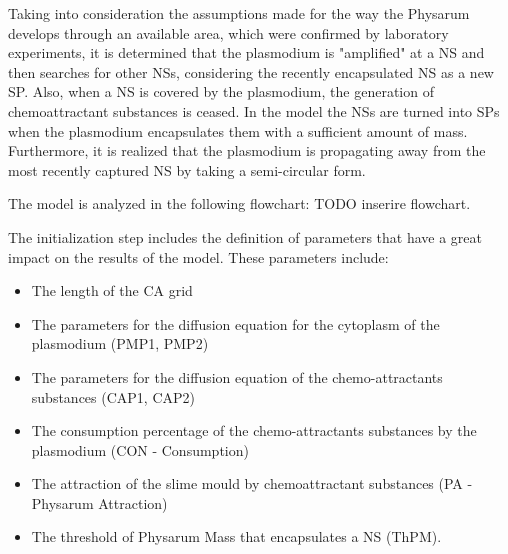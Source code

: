 Taking into consideration the assumptions made for the way the Physarum develops through an available area, which were confirmed by laboratory experiments, it is determined that the plasmodium is "amplified" at a NS and then searches for other NSs, considering the recently encapsulated NS as a new SP. Also, when a NS is covered by the plasmodium, the generation of chemoattractant substances is ceased.
In the model the NSs are turned into SPs when the plasmodium encapsulates them with a sufficient amount of mass. Furthermore, it is realized that the plasmodium is propagating away from the most recently captured NS by taking a semi-circular form. 
\par
The model is analyzed in the following flowchart: TODO inserire flowchart.
\par
The initialization step includes the definition of parameters that have a great impact on the results of the model. These parameters include:
\begin{itemize}
	\item The length of the CA grid
	\item The parameters for the diffusion equation for the cytoplasm of the plasmodium (PMP1, PMP2)
	\item The parameters for the diffusion equation of the chemo-attractants substances (CAP1, CAP2)
	\item The consumption percentage of the chemo-attractants substances by the plasmodium (CON - Consumption)
	\item The attraction of the slime mould by chemoattractant substances (PA - Physarum Attraction)
	\item The threshold of Physarum Mass that encapsulates a NS (ThPM).
\end{itemize}


